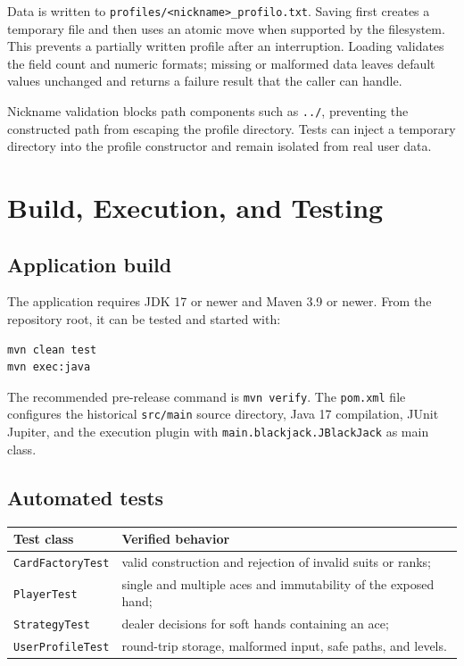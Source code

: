 \documentclass[11pt,a4paper]{report}
\newcommand{\code}[1]{\nolinkurl{#1}}
\begin{document}
Data is written to \code{profiles/<nickname>_profilo.txt}. Saving first creates a
temporary file and then uses an atomic move when supported by the filesystem. This
prevents a partially written profile after an interruption. Loading validates the field
count and numeric formats; missing or malformed data leaves default values unchanged
and returns a failure result that the caller can handle.

Nickname validation blocks path components such as \code{../}, preventing the
constructed path from escaping the profile directory. Tests can inject a temporary
directory into the profile constructor and remain isolated from real user data.

\chapter{Build, Execution, and Testing}

\section{Application build}

The application requires JDK 17 or newer and Maven 3.9 or newer. From the repository
root, it can be tested and started with:

\begin{verbatim}
mvn clean test
mvn exec:java
\end{verbatim}

The recommended pre-release command is \code{mvn verify}. The \code{pom.xml} file
configures the historical \code{src/main} source directory, Java 17 compilation, JUnit
Jupiter, and the execution plugin with \code{main.blackjack.JBlackJack} as main class.

\section{Automated tests}

\noindent\begin{tabularx}{\textwidth}{@{}lX@{}}
\toprule
\textbf{Test class} & \textbf{Verified behavior} \\
\midrule
\code{CardFactoryTest} & valid construction and rejection of invalid suits or ranks; \\
\code{PlayerTest} & single and multiple aces and immutability of the exposed hand; \\
\code{StrategyTest} & dealer decisions for soft hands containing an ace; \\
\code{UserProfileTest} & round-trip storage, malformed input, safe paths, and levels. \\
\bottomrule
\end{tabularx}
\end{document}
